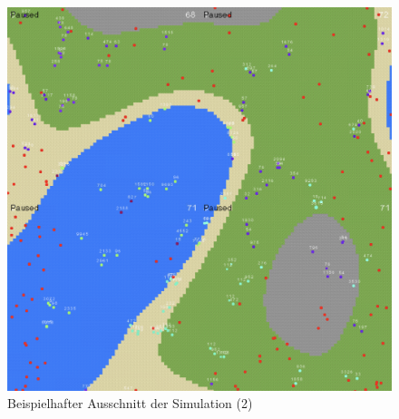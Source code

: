 \documentclass[course=erap]{aspdoc}
\begin{document}
\begin{figure}
    \centering
    \includegraphics[width=\textwidth]{res/ergebnisse-simulation-2.png}
    \caption{Beispielhafter Ausschnitt der Simulation (2)}
    \label{fig:ergebnisse-simulation-2}
\end{figure}
\end{document}
